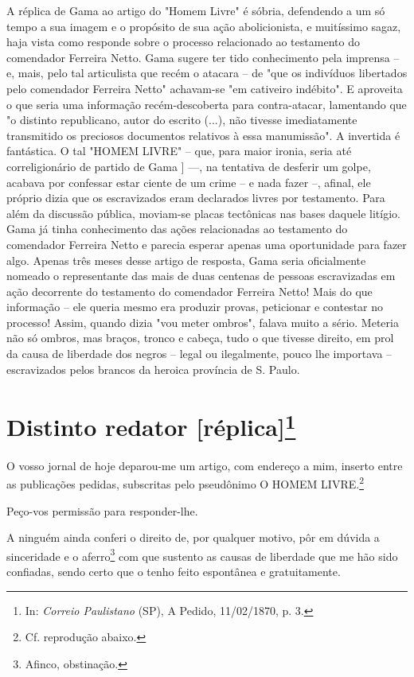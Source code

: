 {\small\noindent
A réplica de Gama ao artigo do "Homem Livre" é sóbria, defendendo
a um só tempo a sua imagem e o propósito de sua ação abolicionista, e
muitíssimo sagaz, haja vista como responde sobre o processo relacionado
ao testamento do comendador Ferreira Netto. Gama sugere ter tido
conhecimento pela imprensa -- e, mais, pelo tal articulista que recém o
atacara -- de "que os indivíduos libertados pelo comendador Ferreira
Netto" achavam-se "em cativeiro indébito". E aproveita o que seria uma
informação recém-descoberta para contra-atacar, lamentando que "o
distinto republicano, autor do escrito (...), não tivesse imediatamente
transmitido os preciosos documentos relativos à essa manumissão". A
invertida é fantástica. O tal "HOMEM LIVRE" -- que, para maior ironia,
seria até correligionário de partido de Gama {]} ---, na tentativa de
desferir um golpe, acabava por confessar estar ciente de um crime -- e
nada fazer --, afinal, ele próprio dizia que os escravizados eram
declarados livres por testamento. Para além da discussão pública,
moviam-se placas tectônicas nas bases daquele litígio. Gama já tinha
conhecimento das ações relacionadas ao testamento do comendador Ferreira
Netto e parecia esperar apenas uma oportunidade para fazer algo. Apenas
três meses desse artigo de resposta, Gama seria oficialmente nomeado o
representante das mais de duas centenas de pessoas escravizadas em ação
decorrente do testamento do comendador Ferreira Netto! Mais do que
informação -- ele queria mesmo era produzir provas, peticionar e
contestar no processo! Assim, quando dizia "vou meter ombros", falava
muito a sério. Meteria não só ombros, mas braços, tronco e cabeça, tudo
o que tivesse direito, em prol da causa de liberdade dos negros -- legal
ou ilegalmente, pouco lhe importava -- escravizados pelos brancos da
heroica província de S. Paulo. }


\chapter{Distinto redator {[}réplica{]}\footnote[*]{In: \emph{Correio
  Paulistano} (SP), A Pedido, 11/02/1870, p. 3.}}


O vosso jornal de hoje deparou-me um artigo, com endereço a mim, inserto
entre as publicações pedidas, subscritas pelo pseudônimo O HOMEM
LIVRE.\footnote{Cf. reprodução abaixo.}

Peço-vos permissão para responder-lhe.

A ninguém ainda conferi o direito de, por qualquer motivo, pôr em dúvida
a sinceridade e o aferro\footnote{Afinco, obstinação.} com que
sustento as causas de liberdade que me hão sido confiadas, sendo certo
que o tenho feito espontânea e gratuitamente.

